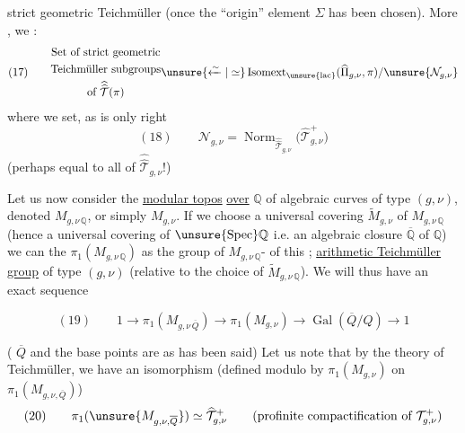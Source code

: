 
strict geometric Teichmüller (once the ``origin'' element $\Sigma$ has been chosen). More , we :
\[
(17)\qquad
\begin{gathered}
\text{Set of strict geometric}\\
\text{Teichmüller subgroups}\\
\text{of }\widehat{\widehat{\mathcal{T}}}(\pi)
\end{gathered}
\unsure{\xleftarrow{\sim}|\simeq}
\operatorname{Isomext}_{\unsure{\mathrm{lac}}}
(\widehat{\Pi}_{g,\nu},\pi)/\unsure{\mathcal{N}_{g,\nu}}
\]
where we set, as is only right
\[
(18)\qquad
\mathcal{N}_{g,\nu}
=\operatorname{Norm}_{\widehat{\widehat{\mathcal{T}}}_{g,\nu}}
\bigl(\widehat{\mathcal{T}}_{g,\nu}^{+}\bigr)
\]
(perhaps equal to all of $\widehat{\widehat{\mathcal{T}}}_{g,\nu}$!)

Let us now consider the \uline{modular topos} \uline{over} $\mathbb{Q}$ of algebraic curves of type $(g,\nu)$, denoted $M_{g,\nu\,\mathbb{Q}}$, or simply $M_{g,\nu}$. If we choose a universal covering $\widetilde{M}_{g,\nu}$ of $M_{g,\nu\,\mathbb{Q}}$ (hence a universal covering of $\unsure{\operatorname{Spec}}\mathbb{Q}$ i.e. an algebraic closure $\overline{\mathbb{Q}}$ of $\mathbb{Q}$) we can  the $\pi_1(M_{g,\nu\,\mathbb{Q}})$ as the group of $M_{g,\nu\,\mathbb{Q}}$- of this ;   \uline{arithmetic Teichmüller group} of type $(g,\nu)$ (relative to the choice of $\widetilde{M}_{g,\nu\,\mathbb{Q}}$). We will thus have an exact sequence



\[
(19)\qquad 1\longrightarrow \pi_1(M_{g,\nu\,\overline{Q}})
\longrightarrow \pi_1(M_{g,\nu})
\longrightarrow \operatorname{Gal}(\overline{Q}/Q)\longrightarrow 1
\]

( $\overline{Q}$ and the base points are  as has been said) Let us note that by the  theory of Teichmüller, we have an isomorphism (defined modulo   by $\pi_1(M_{g,\nu})$ on $\pi_1(M_{g,\nu,\overline{Q}})$)
\[
(20)\qquad \pi_1(\unsure{M_{g,\nu,\overline{Q}}})\simeq\widehat{\mathcal{T}}_{g,\nu}^{+}
\qquad (\text{profinite compactification of }\mathcal{T}_{g,\nu}^{+})
\]


